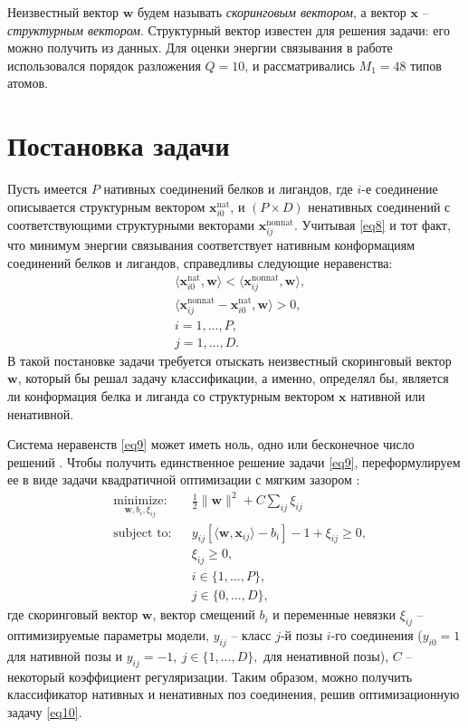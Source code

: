 \documentclass[preprint,12pt,3p]{elsarticle}
\begin{document}
Неизвестный вектор $\mathbf{w}$ будем называть \textit{скоринговым вектором}, а вектор $\mathbf{x}$ -- \textit{структурным вектором}. Структурный вектор известен для решения задачи: его можно получить из данных. Для оценки энергии связывания в работе \cite{regression} использовался порядок разложения $Q=10$, и рассматривались $M_1 = 48$ типов атомов.

\section{Постановка задачи}
Пусть имеется $P$ нативных соединений белков и лигандов, где $i$-е соединение описывается структурным вектором $\mathbf{x}^{\text{nat}}_{i0}$, и $(P\times D)$ ненативных соединений с соответствующими структурными векторами $\mathbf{x}^{\text{nonnat}}_{ij}$. Учитывая \eqref{eq8} и тот факт, что минимум энергии связывания соответствует нативным конформациям соединений белков и лигандов, справедливы следующие неравенства: 
\begin{equation}\label{eq9}
\begin{split}
& \langle\mathbf{x}^{\text{nat}}_{i0}, \mathbf{w}\rangle < \langle\mathbf{x}^{\text{nonnat}}_{ij}, \mathbf{w}\rangle, \\
& \langle\mathbf{x}^{\text{nonnat}}_{ij} - \mathbf{x}^{\text{nat}}_{i0}, \mathbf{w}\rangle > 0, \\
& i = 1,\dots, P, \\
& j = 1, \dots, D.
\end{split}
\end{equation}
В такой постановке задачи требуется отыскать неизвестный скоринговый вектор $\mathbf{w}$, который бы решал задачу классификации, а именно, определял бы, является ли конформация белка и лиганда со структурным вектором $\mathbf{x}$ нативной или ненативной. 

Система неравенств \eqref{eq9} может иметь ноль, одно или бесконечное число решений \cite{classification, vapnik}. Чтобы получить единственное решение задачи \eqref{eq9}, переформулируем ее в виде задачи квадратичной оптимизации с мягким зазором \cite{convex_optimization}:
\begin{equation}\label{eq10}
\begin{aligned}
& \underset{\mathbf{w}, b_i, \xi_{ij}}{\text{minimize:}}
& & \frac{1}{2} \|\mathbf{w}\|^2 + C\sum\limits_{ij}\xi_{ij} \\
& \text{subject to:}
& & y_{ij}[\langle\mathbf{w},\mathbf{x}_{ij}\rangle - b_i]-1+\xi_{ij} \geq 0, \\
&&& \xi_{ij} \geq 0,\\
&&&i\in\{1,\dots,P\}, \\
&&&j\in\{0,\dots,D\},
\end{aligned}
\end{equation}
где скоринговый вектор $\mathbf{w}$, вектор смещений $b_i$ и переменные невязки $\xi_{ij}$ -- оптимизируемые параметры модели, $y_{ij}$ -- класс $j$-й позы $i$-го соединения ($y_{i0}=1$ для нативной позы и $y_{ij}=-1, \ j\in\{1,\dots,D\},$ для ненативной позы), $C$ -- некоторый коэффициент регуляризации. Таким образом, можно получить классификатор нативных и ненативных поз соединения, решив оптимизационную задачу \eqref{eq10}.
\end{document}
